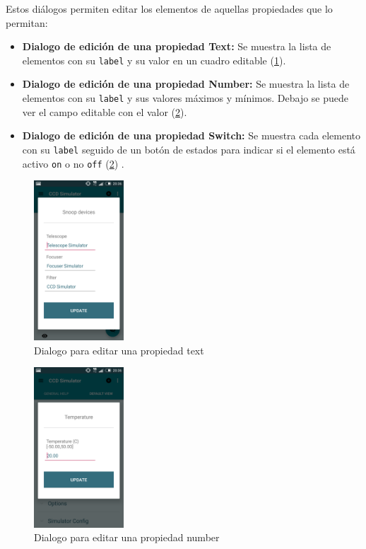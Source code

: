 Estos diálogos permiten editar los elementos de aquellas propiedades que lo permitan:

\begin{itemize}
  \item \textbf{Dialogo de edición de una propiedad Text:} Se muestra la lista de elementos con su \texttt{label} y su valor en un cuadro editable (\ref{fig:text_edit}).
  \item \textbf{Dialogo de edición de una propiedad Number:} Se muestra la lista de elementos con su \texttt{label} y sus valores máximos y mínimos. Debajo se puede ver el campo editable con el valor (\ref{fig:number_edit}).
  \item \textbf{Dialogo de edición de una propiedad Switch:} Se muestra cada elemento con su \texttt{label} seguido de un botón de estados para indicar si el elemento está activo \texttt{on} o no \texttt{off} (\ref{fig:number_edit}) .
\end{itemize}


\begin{figure}[!ht]
  \begin{center}
  \includegraphics[width=0.3\textwidth]{../images/text_edit_view.png}
  \caption{Dialogo para editar una propiedad text}
  \label{fig:text_edit}
  \end{center}
\end{figure}


\begin{figure}[!ht]
  \begin{center}
  \includegraphics[width=0.3\textwidth]{../images/number_edit_view.png}
  \caption{Dialogo para editar una propiedad number}
  \label{fig:number_edit}
  \end{center}
\end{figure}


